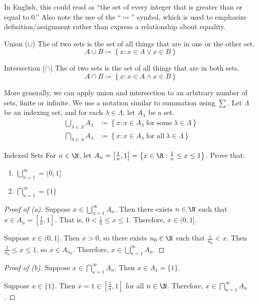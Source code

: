 In English, this could read as ``the set of every integer that is greater than or equal to $0$.'' Also note the use of the ``$\coloneq$'' symbol, which is used to emphasize definition/assignment rather than express a relationship about equality.

\begin{dfnbox}{Union ($\cup$)}{}
    The  of two sets is the set of all things that are in one or the other set.
    \tcblower
    \[ A \cup B \coloneq \left\{ x : x \in A \lor x \in B \right\} \]
\end{dfnbox}

\begin{dfnbox}{Intersection ($\cap$)}{}
    The  of two sets is the set of all things that are in both sets.
    \tcblower
    \[ A \cap B \coloneq \left\{ x : x \in A \land x \in B \right\} \]
\end{dfnbox}

More generally, we can apply union and intersection to an arbitrary number of sets, finite or infinite. We use a notation similar to summation using $\sum$. Let $\Lambda$ be an indexing set, and for each $\lambda \in \Lambda$, let $A_\lambda$ be a set.
\begin{align*}
    \bigcup_{\lambda \in \Lambda} A_\lambda &\coloneq \left\{ x : x \in A_\lambda\ \text{for some}\ \lambda \in \Lambda \right\} \\
    \bigcap_{\lambda \in \Lambda} A_\lambda &\coloneq \left\{ x : x \in A_\lambda\ \text{for all}\ \lambda \in \Lambda \right\}
\end{align*}
\begin{exbox}{Indexed Sets}{}
    For $n \in \N$, let $A_n = \left[ \frac{1}{n}, 1 \right] = \left\{ x \in \R : \frac{1}{n} \leq x \leq 1 \right\}$. Prove that:
    \begin{enumerate}[label=(\alph*)]
        \item $\bigcup_{n=1}^\infty = (0,1]$
        \item $\bigcap_{n=1}^\infty = \{1\}$
    \end{enumerate}
    \tcblower
    \begin{proof}[Proof of (a)]
        Suppose $x \in \bigcup_{n=1}^\infty A_n$. Then there exists $n \in \N$ such that $x \in A_n = \left[ \frac{1}{n}, 1 \right]$. That is, $0 < \frac{1}{n} \leq x \leq 1$. Therefore, $x \in (0, 1]$.

        Suppose $x \in (0, 1]$. Then $x > 0$, so there exists $n_0 \in \N$ such that $\frac{1}{n_0} < x$. Then $\frac{1}{n_0} \leq x \leq 1$, so $x \in A_{n_0}$. Therefore, $x \in \bigcup_{n=1}^\infty A_n$.
    \end{proof}

    \begin{proof}[Proof of (b)]
        Suppose $x \in \bigcap_{n=1}^\infty A_n$. Then $x \in A_1 = \{1\}$.

        Suppose $x \in \{1\}$. Then $x = 1 \in \left[ \frac{1}{n}, 1 \right]$ for all $n \in \N$. Therefore, $x \in \bigcap_{n=1}^\infty A_n$.
    \end{proof}
\end{exbox}

